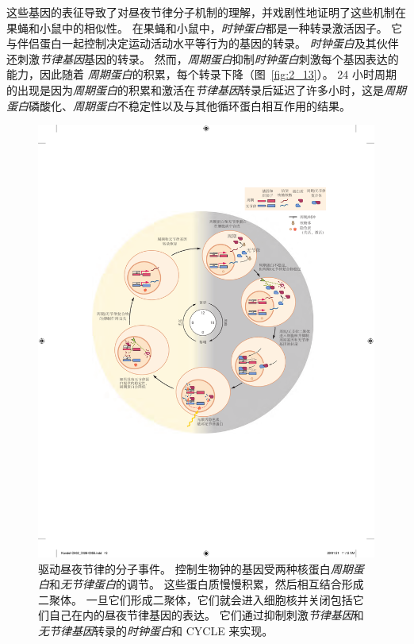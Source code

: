 这些基因的表征导致了对昼夜节律分子机制的理解，并戏剧性地证明了这些机制在果蝇和小鼠中的相似性。
在果蝇和小鼠中，\textit{时钟蛋白}都是一种转录激活因子。 
它与伴侣蛋白一起控制决定运动活动水平等行为的基因的转录。
\textit{时钟蛋白}及其伙伴还刺激\textit{节律基因}基因的转录。
然而，\textit{周期蛋白}抑制\textit{时钟蛋白}刺激每个基因表达的能力，因此随着 \textit{周期蛋白}的积累，每个转录下降（图~\ref{fig:2_13}）。
24 小时周期的出现是因为\textit{周期蛋白}的积累和激活在\textit{节律基因}转录后延迟了许多小时，这是\textit{周期蛋白}磷酸化、\textit{周期蛋白}不稳定性以及与其他循环蛋白相互作用的结果。


\begin{figure}[htbp]
	\centering
	\includegraphics[width=1.0\linewidth]{chap02/fig_2_13}
	\caption{驱动昼夜节律的分子事件。
		控制生物钟的基因受两种核蛋白\textit{周期蛋白}和\textit{无节律蛋白}的调节。
		这些蛋白质慢慢积累，然后相互结合形成二聚体。
		一旦它们形成二聚体，它们就会进入细胞核并关闭包括它们自己在内的昼夜节律基因的表达。
		它们通过抑制刺激\textit{节律基因}和\textit{无节律基因}转录的\textit{时钟蛋白}和 CYCLE 来实现。
}
\end{figure}
